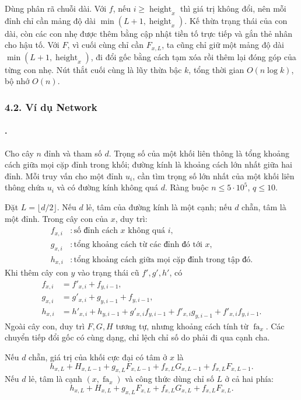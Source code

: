 \documentclass[11pt]{article}
\begin{document}
Dùng phân rã chuỗi dài. Với \(f\), nếu \(i\ge \operatorname{height}_x\) thì giá
trị không đổi, nên mỗi đỉnh chỉ cần mảng độ dài
\(\min(L+1,\operatorname{height}_x)\). Kế thừa trạng thái của con dài, còn các
con nhẹ được thêm bằng cập nhật tiền tố trực tiếp và gắn thẻ nhân cho hậu tố.
Với \(F\), vì cuối cùng chỉ cần \(F_{x,L}\), ta cũng chỉ giữ một mảng độ dài
\(\min(L+1,\operatorname{height}_x)\), đi đổi gốc bằng cách tạm xóa rồi thêm
lại đóng góp của từng con nhẹ. Nút thắt cuối cùng là lũy thừa bậc \(k\), tổng
thời gian \(O(n\log k)\), bộ nhớ \(O(n)\).

\subsubsection*{4.2. Ví dụ Network}

\paragraph{.}
Cho cây \(n\) đỉnh và tham số \(d\). Trọng số của một khối liên thông là tổng
khoảng cách giữa mọi cặp đỉnh trong khối; đường kính là khoảng cách lớn nhất
giữa hai đỉnh. Mỗi truy vấn cho một đỉnh \(u_i\), cần tìm trọng số lớn nhất của
một khối liên thông chứa \(u_i\) và có đường kính không quá \(d\). Ràng buộc
\(n\le 5\cdot 10^5\), \(q\le 10\).

Đặt \(L=\lfloor d/2\rfloor\). Nếu \(d\) lẻ, tâm của đường kính là một cạnh; nếu
\(d\) chẵn, tâm là một đỉnh. Trong cây con của \(x\), duy trì:
\[
\begin{aligned}
  f_{x,i} &: \text{số đỉnh cách }x\text{ không quá }i,\\
  g_{x,i} &: \text{tổng khoảng cách từ các đỉnh đó tới }x,\\
  h_{x,i} &: \text{tổng khoảng cách giữa mọi cặp đỉnh trong tập đó}.
\end{aligned}
\]
Khi thêm cây con \(y\) vào trạng thái cũ \(f',g',h'\), có
\[
\begin{aligned}
  f_{x,i} &= f'_{x,i}+f_{y,i-1},\\
  g_{x,i} &= g'_{x,i}+g_{y,i-1}+f_{y,i-1},\\
  h_{x,i} &= h'_{x,i}+h_{y,i-1}
    +g'_{x,i}f_{y,i-1}+f'_{x,i}g_{y,i-1}+f'_{x,i}f_{y,i-1}.
\end{aligned}
\]
Ngoài cây con, duy trì \(F,G,H\) tương tự, nhưng khoảng cách tính từ
\(\operatorname{fa}_x\). Các chuyển tiếp đổi gốc có cùng dạng, chỉ lệch chỉ số
do phải đi qua cạnh cha.

Nếu \(d\) chẵn, giá trị của khối cực đại có tâm ở \(x\) là
\[
  h_{x,L}+H_{x,L-1}+g_{x,L}F_{x,L-1}
  +f_{x,L}G_{x,L-1}+f_{x,L}F_{x,L-1}.
\]
Nếu \(d\) lẻ, tâm là cạnh \((x,\operatorname{fa}_x)\) và công thức dùng chỉ số
\(L\) ở cả hai phía:
\[
  h_{x,L}+H_{x,L}+g_{x,L}F_{x,L}
  +f_{x,L}G_{x,L}+f_{x,L}F_{x,L}.
\]
\end{document}
